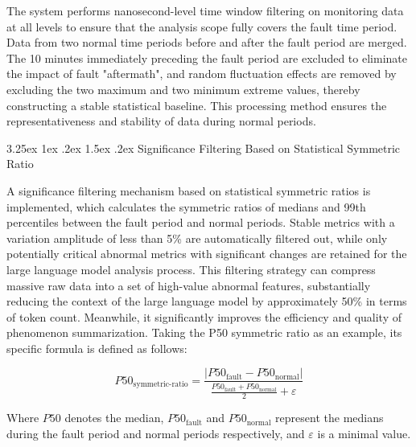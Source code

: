 \documentclass[10pt]{article}
\makeatletter
\renewcommand{\paragraph}{%
    \@startsection{paragraph}{4}{\z@}%
    {3.25ex \@plus1ex \@minus.2ex}%
    {1.5ex \@plus.2ex}%
    {\normalfont\normalsize\itshape}%
}
\makeatother
\begin{document}
The system performs nanosecond-level time window filtering on monitoring data at all levels to ensure that the analysis scope fully covers the fault time period. Data from two normal time periods before and after the fault period are merged. The 10 minutes immediately preceding the fault period are excluded to eliminate the impact of fault "aftermath", and random fluctuation effects are removed by excluding the two maximum and two minimum extreme values, thereby constructing a stable statistical baseline. This processing method ensures the representativeness and stability of data during normal periods.

\paragraph{Significance Filtering Based on Statistical Symmetric Ratio}

A significance filtering mechanism based on statistical symmetric ratios is implemented, which calculates the symmetric ratios of medians and 99th percentiles between the fault period and normal periods. Stable metrics with a variation amplitude of less than 5\% are automatically filtered out, while only potentially critical abnormal metrics with significant changes are retained for the large language model analysis process. This filtering strategy can compress massive raw data into a set of high-value abnormal features, substantially reducing the context of the large language model by approximately 50\% in terms of token count. Meanwhile, it significantly improves the efficiency and quality of phenomenon summarization. Taking the P50 symmetric ratio as an example, its specific formula is defined as follows:

\begin{equation}
P50_{\mathrm{symmetric\text{-}ratio}} = \frac{ \left| P50_{\mathrm{fault}} - P50_{\mathrm{normal}} \right| }{ \frac{ P50_{\mathrm{fault}} + P50_{\mathrm{normal}} }{2} + \varepsilon }
\end{equation}

Where $P50$ denotes the median, $P50_{\mathrm{fault}}$ and $P50_{\mathrm{normal}}$ represent the medians during the fault period and normal periods respectively, and $\varepsilon$ is a minimal value.
\end{document}
